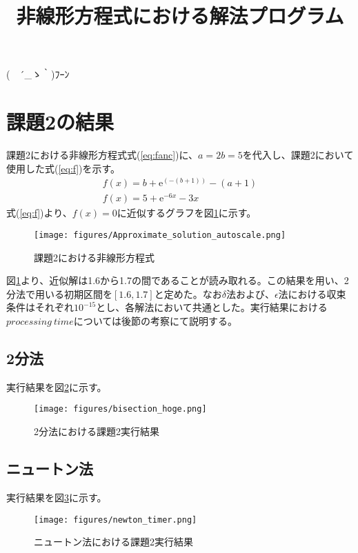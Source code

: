 \documentclass[uplatex]{jsarticle}
\title{非線形方程式における解法プログラム}
\author{\vspace{-30mm}}
\date{\vspace{-10mm}}
\begin{document}
\maketitle
\begin{flushright}
(　´\_ゝ｀)ﾌｰﾝ
\end{flushright}
\section{課題2の結果}
課題2における非線形方程式式(\ref{eq:fanc})に、$a=2$$b=5$を代入し、課題2において使用した式(\ref{eq:f})を示す。
\begin{eqnarray}
f(x)=b+\mathrm{e}^{(-(b+1))}-(a+1) \label{eq:fanc}\\
f(x)=5+\mathrm{e}^{-6x}-3x \label{eq:f}
\end{eqnarray}
式(\ref{eq:f})より、$f(x)=0$に近似するグラフを図\ref{fig:Approximate}に示す。
\begin{figure}[ht]
  \centering
   \texttt{[image: figures/Approximate\_solution\_autoscale.png]}
   \caption{課題2における非線形方程式}
   \label{fig:Approximate}
\end{figure}

図\ref{fig:Approximate}より、近似解は1.6から1.7の間であることが読み取れる。この結果を用い、2分法で用いる初期区間を$[1.6,1.7]$と定めた。なお$\delta$法および、$\epsilon$法における収束条件はそれぞれ${10}^{-15}$とし、各解法において共通とした。実行結果における$processing\ time$については後節の考察にて説明する。

\newpage

\subsection{2分法}
実行結果を図\ref{fig:bisection}に示す。
\begin{figure}[ht]
  \centering
   \texttt{[image: figures/bisection\_hoge.png]}
   \caption{2分法における課題2実行結果}
   \label{fig:bisection}
\end{figure}

\subsection{ニュートン法}
実行結果を図\ref{fig:newton}に示す。
\begin{figure}[ht]
  \centering
   \texttt{[image: figures/newton\_timer.png]}
   \caption{ニュートン法における課題2実行結果}
   \label{fig:newton}
\end{figure}
\end{document}
